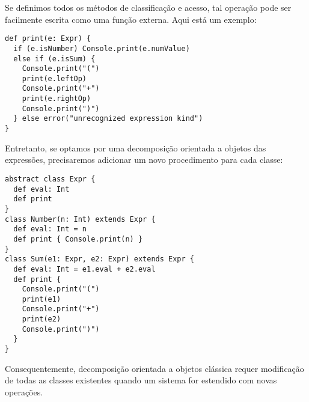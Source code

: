 Se definimos todos os m\'{e}todos de classifica\c{c}\~{a}o e acesso, tal opera\c{c}\~{a}o pode ser 
facilmente escrita como uma fun\c{c}\~{a}o externa. Aqui est\'{a} um exemplo: 
\begin{lstlisting}
def print(e: Expr) {
  if (e.isNumber) Console.print(e.numValue)
  else if (e.isSum) {
    Console.print("(")
    print(e.leftOp)
    Console.print("+")
    print(e.rightOp)
    Console.print(")")
  } else error("unrecognized expression kind")
}
\end{lstlisting}
Entretanto, se optamos por uma decomposi\c{c}\~{a}o orientada a objetos das 
express\~{o}es, precisaremos adicionar um novo procedimento  
para cada classe: 
\begin{lstlisting}
abstract class Expr {
  def eval: Int
  def print
}
class Number(n: Int) extends Expr {
  def eval: Int = n
  def print { Console.print(n) }
}
class Sum(e1: Expr, e2: Expr) extends Expr {
  def eval: Int = e1.eval + e2.eval
  def print {
    Console.print("(")
    print(e1)
    Console.print("+")
    print(e2)
    Console.print(")")
  }
}
\end{lstlisting}

Consequentemente, decomposi\c{c}\~{a}o orientada a objetos cl\'{a}ssica requer modifica\c{c}\~{a}o 
de todas as classes existentes quando um sistema for estendido com novas
opera\c{c}\~{o}es.


